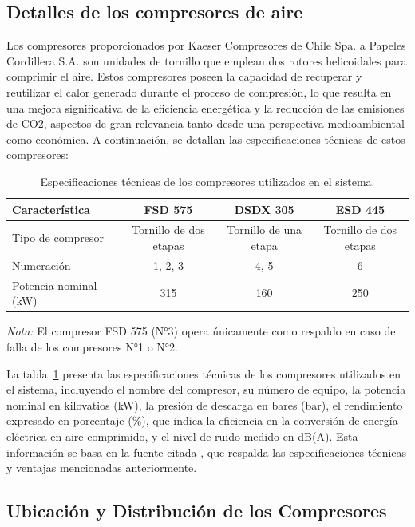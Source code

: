 \documentclass[11pt,a4paper]{article}  %
\begin{document}
\subsection{Detalles de los compresores de aire}
Los compresores proporcionados por Kaeser Compresores de Chile Spa. a Papeles Cordillera S.A. son unidades de tornillo que emplean dos rotores helicoidales para comprimir el aire. Estos compresores poseen la capacidad de recuperar y reutilizar el calor generado durante el proceso de compresión, lo que resulta en una mejora significativa de la eficiencia energética y la reducción de las emisiones de CO2, aspectos de gran relevancia tanto desde una perspectiva medioambiental como económica. A continuación, se detallan las especificaciones técnicas de estos compresores:

\begin{table}[h]
\footnotesize
\centering
\begin{tabular}{lccc}\toprule
Característica & FSD 575 & DSDX 305 & ESD 445 \\ \midrule
Tipo de compresor & Tornillo de dos etapas & Tornillo de una etapa & Tornillo de dos etapas \\
Numeración & 1, 2, 3 & 4, 5 & 6 \\
Potencia nominal (kW) & 315 & 160 & 250 \\\bottomrule
\end{tabular}
\caption{Especificaciones técnicas de los compresores utilizados en el sistema.}
\label{tab:especificaciones_compresores_ampliadas}
\footnotesize
\textit{Nota:} El compresor FSD 575 (N°3) opera únicamente como respaldo en caso de falla de los compresores N°1 o N°2.
\end{table}

La tabla~\ref{tab:especificaciones_compresores_ampliadas} presenta las especificaciones técnicas de los compresores utilizados en el sistema, incluyendo el nombre del compresor, su número de equipo, la potencia nominal en kilovatios (kW), la presión de descarga en bares (bar), el rendimiento expresado en porcentaje (\%), que indica la eficiencia en la conversión de energía eléctrica en aire comprimido, y el nivel de ruido medido en dB(A). Esta información se basa en la fuente citada \cite{kaeser2023}, que respalda las especificaciones técnicas y ventajas mencionadas anteriormente.


\subsection{Ubicación y Distribución de los Compresores}
\end{document}
